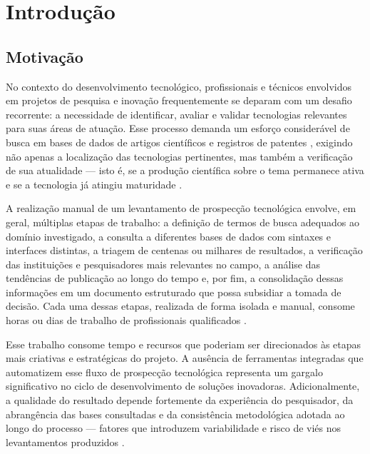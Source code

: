 \documentclass[12pt, a4paper]{article}
\begin{document}
\newpage
\tableofcontents

\newpage
\pagestyle{textual}
\setcounter{page}{3}

\section{Introdução}

  \subsection{Motivação}

  No contexto do desenvolvimento tecnológico, profissionais e técnicos envolvidos
em projetos de pesquisa e inovação frequentemente se deparam com um desafio
recorrente: a necessidade de identificar, avaliar e validar tecnologias
relevantes para suas áreas de atuação. Esse processo demanda um esforço considerável de busca em bases de dados de artigos científicos e registros de patentes \cite{rodriguezsalvador2017}, exigindo não apenas a localização das tecnologias pertinentes, mas também a verificação de sua atualidade --- isto é, se a produção científica sobre o tema permanece ativa e se a tecnologia já atingiu maturidade \cite{lezamanicolas2018}.

  A realização manual de um levantamento de prospecção tecnológica envolve,
em geral, múltiplas etapas de trabalho: a definição de termos de busca adequados
ao domínio investigado, a consulta a diferentes bases de dados com sintaxes e
interfaces distintas, a triagem de centenas ou milhares de resultados, a
verificação das instituições e pesquisadores mais relevantes no campo, a análise
das tendências de publicação ao longo do tempo e, por fim, a consolidação dessas
informações em um documento estruturado que possa subsidiar a tomada de decisão.
Cada uma dessas etapas, realizada de forma isolada e manual, consome horas ou
dias de trabalho de profissionais qualificados \cite{porter2004}.

  Esse trabalho consome tempo e recursos que poderiam ser direcionados às
etapas mais criativas e estratégicas do projeto. A ausência de ferramentas
integradas que automatizem esse fluxo de prospecção tecnológica representa um
gargalo significativo no ciclo de desenvolvimento de soluções inovadoras.
Adicionalmente, a qualidade do resultado depende fortemente da experiência do
pesquisador, da abrangência das bases consultadas e da consistência metodológica
adotada ao longo do processo --- fatores que introduzem variabilidade e risco de
viés nos levantamentos produzidos \cite{mayerhoff2008}.
\end{document}
